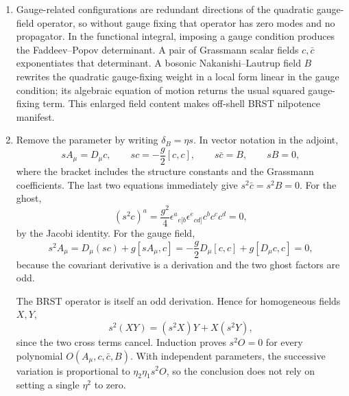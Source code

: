 \begin{enumerate}
\begin{enumerate}
    \item[(c)] Gauge-related configurations are redundant directions of the
      quadratic gauge-field operator, so without gauge fixing that operator
      has zero modes and no propagator.  In the functional integral, imposing
      a gauge condition produces the Faddeev--Popov determinant.  A pair of
      Grassmann scalar fields \(c,\bar c\) exponentiates that determinant.
      A bosonic Nakanishi--Lautrup field \(B\) rewrites the quadratic
      gauge-fixing weight in a local form linear in the gauge condition; its
      algebraic equation of motion returns the usual squared gauge-fixing
      term.  This enlarged field content makes off-shell BRST nilpotence
      manifest.

    \item[(d)] Remove the parameter by writing
      \(\delta_B=\eta s\).  In vector notation in the adjoint,
      \[
        sA_\mu=D_\mu c,\qquad
        sc=-\frac g2[c,c],\qquad
        s\bar c=B,\qquad sB=0,
      \]
      where the bracket includes the structure constants and the
      Grassmann coefficients.  The last two equations immediately give
      \(s^2\bar c=s^2B=0\).  For the ghost,
      \[
        (s^2c)^a
          =\frac{g^2}{4}
            \epsilon^{a}{}_{e[b}\epsilon^{e}{}_{cd]}
            c^bc^cc^d=0,
      \]
      by the Jacobi identity.  For the gauge field,
      \[
        s^2A_\mu=D_\mu(sc)+g[sA_\mu,c]
          =-\frac g2D_\mu[c,c]+g[D_\mu c,c]=0,
      \]
      because the covariant derivative is a derivation and the two ghost
      factors are odd.

      The BRST operator is itself an odd derivation.  Hence for homogeneous
      fields \(X,Y\),
      \[
        s^2(XY)=(s^2X)Y+X(s^2Y),
      \]
      since the two cross terms cancel.  Induction proves \(s^2O=0\) for
      every polynomial \(O(A_\mu,c,\bar c,B)\).  With independent
      parameters, the successive variation is proportional to
      \(\eta_2\eta_1s^2O\), so the conclusion does not rely on setting a
      single \(\eta^2\) to zero.
  \end{enumerate}


\end{enumerate}
